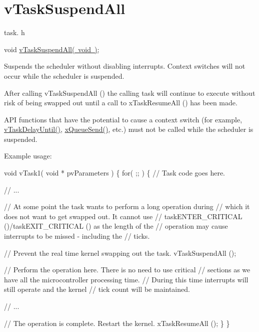 \hypertarget{group__v_task_suspend_all}{}\section{v\+Task\+Suspend\+All}
\label{group__v_task_suspend_all}
task. h 
\begin{DoxyPre}void \mbox{\hyperlink{task_8h_a366b302eba79d10b5ee2a3756f0fcc43}{vTaskSuspendAll( void )}};\end{DoxyPre}


Suspends the scheduler without disabling interrupts. Context switches will not occur while the scheduler is suspended.

After calling v\+Task\+Suspend\+All () the calling task will continue to execute without risk of being swapped out until a call to x\+Task\+Resume\+All () has been made.

A\+PI functions that have the potential to cause a context switch (for example, \mbox{\hyperlink{task_8h_a067da3e949e248096ec6c01f9cb75a47}{v\+Task\+Delay\+Until()}}, \mbox{\hyperlink{queue_8h_af7eb49d3249351176992950d9185abe9}{x\+Queue\+Send()}}, etc.) must not be called while the scheduler is suspended.

Example usage\+: 
\begin{DoxyPre}
void vTask1( void * pvParameters )
\{
    for( ;; )
    \{
     // Task code goes here.\end{DoxyPre}



\begin{DoxyPre}     // ...\end{DoxyPre}



\begin{DoxyPre}     // At some point the task wants to perform a long operation during
     // which it does not want to get swapped out.  It cannot use
     // taskENTER\_CRITICAL ()/taskEXIT\_CRITICAL () as the length of the
     // operation may cause interrupts to be missed - including the
     // ticks.\end{DoxyPre}



\begin{DoxyPre}     // Prevent the real time kernel swapping out the task.
     vTaskSuspendAll ();\end{DoxyPre}



\begin{DoxyPre}     // Perform the operation here.  There is no need to use critical
     // sections as we have all the microcontroller processing time.
     // During this time interrupts will still operate and the kernel
     // tick count will be maintained.\end{DoxyPre}



\begin{DoxyPre}     // ...\end{DoxyPre}



\begin{DoxyPre}     // The operation is complete.  Restart the kernel.
     xTaskResumeAll ();
    \}
\}
  \end{DoxyPre}
 